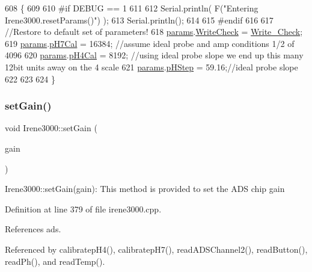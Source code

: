 \begin{DoxyCode}
608 \{
609 
610 \textcolor{preprocessor}{#if DEBUG == 1 }
611 
612     Serial.println( F(\textcolor{stringliteral}{"Entering Irene3000.resetParams()"}) );
613     Serial.println();
614 
615 \textcolor{preprocessor}{#endif }
616 
617     \textcolor{comment}{//Restore to default set of parameters!}
618     \hyperlink{classIrene3000_a136585a5ee7f9ac6ab52175fa153f8e3}{params}.\hyperlink{structIrene3000_1_1parameters__T_a56f1f14d33a69300d580eda2dc52cecd}{WriteCheck} = \hyperlink{Irene3000_8h_a9fa3b8fd890fde289060ee254cd273d5}{Write\_Check};
619     \hyperlink{classIrene3000_a136585a5ee7f9ac6ab52175fa153f8e3}{params}.\hyperlink{structIrene3000_1_1parameters__T_a21265466a570d84bff914f26d2f7a03e}{pH7Cal} = 16384; \textcolor{comment}{//assume ideal probe and amp conditions 1/2 of 4096}
620     \hyperlink{classIrene3000_a136585a5ee7f9ac6ab52175fa153f8e3}{params}.\hyperlink{structIrene3000_1_1parameters__T_a1144de6fb54eb3e1dd2a3d8c2afc97dc}{pH4Cal} = 8192; \textcolor{comment}{//using ideal probe slope we end up this many 12bit units away on the
       4 scale}
621     \hyperlink{classIrene3000_a136585a5ee7f9ac6ab52175fa153f8e3}{params}.\hyperlink{structIrene3000_1_1parameters__T_a61cfcc2539d5f630e9071f3753aba9fe}{pHStep} = 59.16;\textcolor{comment}{//ideal probe slope}
622 
623 
624 \}
\end{DoxyCode}
\mbox{\label{classIrene3000_aff7c5da186b388e7272e63ff88a20c34}} 
\subsubsection{\texorpdfstring{set\+Gain()}{setGain()}}
{\footnotesize\ttfamily void Irene3000\+::set\+Gain (\begin{DoxyParamCaption}\item[{ads\+Gain\+\_\+t}]{gain }\end{DoxyParamCaption})}

Irene3000\+::set\+Gain(gain)\+: This method is provided to set the A\+DS chip gain 

Definition at line 379 of file irene3000.\+cpp.



References ads.



Referenced by calibratep\+H4(), calibratep\+H7(), read\+A\+D\+S\+Channel2(), read\+Button(), read\+Ph(), and read\+Temp().


